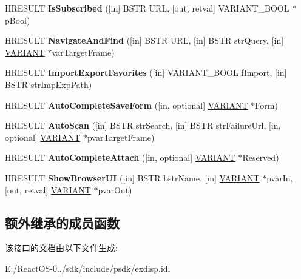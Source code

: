 \begin{DoxyCompactItemize}
\mbox{\label{interface_s_h_doc_vw_1_1_i_shell_u_i_helper_a450cf7d9121696b8488277c675d875a9}} 
H\+R\+E\+S\+U\+LT {\bfseries Is\+Subscribed} (\mbox{[}in\mbox{]} B\+S\+TR U\+RL, \mbox{[}out, retval\mbox{]} V\+A\+R\+I\+A\+N\+T\+\_\+\+B\+O\+OL $\ast$p\+Bool)
\item 
\mbox{\label{interface_s_h_doc_vw_1_1_i_shell_u_i_helper_a184f276d32f12b47c45185f58119c767}} 
H\+R\+E\+S\+U\+LT {\bfseries Navigate\+And\+Find} (\mbox{[}in\mbox{]} B\+S\+TR U\+RL, \mbox{[}in\mbox{]} B\+S\+TR str\+Query, \mbox{[}in\mbox{]} \hyperlink{structtag_v_a_r_i_a_n_t}{V\+A\+R\+I\+A\+NT} $\ast$var\+Target\+Frame)
\item 
\mbox{\label{interface_s_h_doc_vw_1_1_i_shell_u_i_helper_a58cacbf41e9d4d824dadd0179e08a9b6}} 
H\+R\+E\+S\+U\+LT {\bfseries Import\+Export\+Favorites} (\mbox{[}in\mbox{]} V\+A\+R\+I\+A\+N\+T\+\_\+\+B\+O\+OL f\+Import, \mbox{[}in\mbox{]} B\+S\+TR str\+Imp\+Exp\+Path)
\item 
\mbox{\label{interface_s_h_doc_vw_1_1_i_shell_u_i_helper_abf3a686305847e43274b62c759d3618c}} 
H\+R\+E\+S\+U\+LT {\bfseries Auto\+Complete\+Save\+Form} (\mbox{[}in, optional\mbox{]} \hyperlink{structtag_v_a_r_i_a_n_t}{V\+A\+R\+I\+A\+NT} $\ast$Form)
\item 
\mbox{\label{interface_s_h_doc_vw_1_1_i_shell_u_i_helper_a4b8b91a4688733fd0554398b944cea2f}} 
H\+R\+E\+S\+U\+LT {\bfseries Auto\+Scan} (\mbox{[}in\mbox{]} B\+S\+TR str\+Search, \mbox{[}in\mbox{]} B\+S\+TR str\+Failure\+Url, \mbox{[}in, optional\mbox{]} \hyperlink{structtag_v_a_r_i_a_n_t}{V\+A\+R\+I\+A\+NT} $\ast$pvar\+Target\+Frame)
\item 
\mbox{\label{interface_s_h_doc_vw_1_1_i_shell_u_i_helper_aa4b4d119c2dab4c071236881f60452e2}} 
H\+R\+E\+S\+U\+LT {\bfseries Auto\+Complete\+Attach} (\mbox{[}in, optional\mbox{]} \hyperlink{structtag_v_a_r_i_a_n_t}{V\+A\+R\+I\+A\+NT} $\ast$Reserved)
\item 
\mbox{\label{interface_s_h_doc_vw_1_1_i_shell_u_i_helper_afd26c13eca753f18a76b824d24075b8f}} 
H\+R\+E\+S\+U\+LT {\bfseries Show\+Browser\+UI} (\mbox{[}in\mbox{]} B\+S\+TR bstr\+Name, \mbox{[}in\mbox{]} \hyperlink{structtag_v_a_r_i_a_n_t}{V\+A\+R\+I\+A\+NT} $\ast$pvar\+In, \mbox{[}out, retval\mbox{]} \hyperlink{structtag_v_a_r_i_a_n_t}{V\+A\+R\+I\+A\+NT} $\ast$pvar\+Out)
\end{DoxyCompactItemize}
\subsection*{额外继承的成员函数}


该接口的文档由以下文件生成\+:\begin{DoxyCompactItemize}
\item 
E\+:/\+React\+O\+S-\/0../sdk/include/psdk/exdisp.\+idl\end{DoxyCompactItemize}
